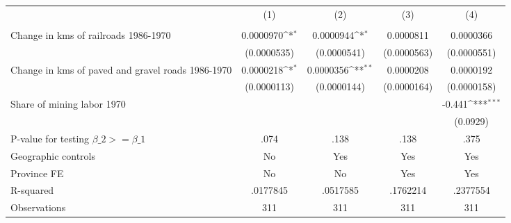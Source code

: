 {
\def\sym#1{\ifmmode^{#1}\else\(^{#1}\)\fi}
\begin{tabular}{l*{4}{c}}
\hline\hline
                &\multicolumn{1}{c}{(1)}&\multicolumn{1}{c}{(2)}&\multicolumn{1}{c}{(3)}&\multicolumn{1}{c}{(4)}\\
                &\multicolumn{1}{c}{}&\multicolumn{1}{c}{}&\multicolumn{1}{c}{}&\multicolumn{1}{c}{}\\
\hline
Change in kms of railroads 1986-1970&0.0000970\sym{*}  &0.0000944\sym{*}  &0.0000811         &0.0000366         \\
                &(0.0000535)         &(0.0000541)         &(0.0000563)         &(0.0000551)         \\
[1em]
Change in kms of paved and gravel roads 1986-1970&0.0000218\sym{*}  &0.0000356\sym{**} &0.0000208         &0.0000192         \\
                &(0.0000113)         &(0.0000144)         &(0.0000164)         &(0.0000158)         \\
[1em]
Share of mining labor 1970&                  &                  &                  &   -0.441\sym{***}\\
                &                  &                  &                  & (0.0929)         \\
\hline
P-value for testing $\beta\_{2} >= \beta\_{1}$&     .074         &     .138         &     .138         &     .375         \\
Geographic controls&       No         &      Yes         &      Yes         &      Yes         \\
Province FE     &       No         &       No         &      Yes         &      Yes         \\
R-squared       & .0177845         & .0517585         & .1762214         & .2377554         \\
Observations    &      311         &      311         &      311         &      311         \\
\hline\hline
\end{tabular}
}
